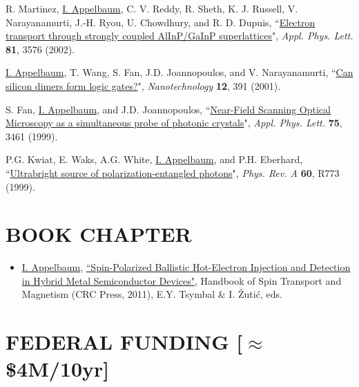 \documentclass[paper=letter,fontsize=11pt]{scrartcl} %
\newcommand{\NewPart}[2]{\section*{\uppercase{#1} #2}}
\newcommand{\PaperEntry}[7]{
		\noindent #1, ``\href{#7}{#2}", \textit{#3} \textbf{#4}, #5 (#6).}
\newcommand{\ArxivEntry}[3]{
		\noindent #1, ``\href{http://arxiv.org/abs/#3}{#2}", \textit{{cond-mat/}#3}.}
\begin{document}
\begin{etaremune}
\item\PaperEntry{R. Martinez, \underline{I. Appelbaum}, C. V. Reddy, R. Sheth, K. J. Russell, V. Narayanamurti, J.-H. Ryou, U. Chowdhury, and R. D. Dupuis}{Electron transport through strongly coupled AlInP/GaInP superlattices}{Appl. Phys. Lett.}{81}{3576}{2002}{http://dx.doi.org/10.1063/1.1519350}

\item\PaperEntry{\underline{I. Appelbaum}, T. Wang, S. Fan, J.D. Joannopoulos, and V. Narayanamurti}{Can silicon dimers form logic gates?}{Nanotechnology}{12}{391}{2001}{http://dx.doi.org/10.1088/0957-4484/12/3/330}

\item\PaperEntry{S. Fan, \underline{I. Appelbaum}, and J.D. Joannopoulos}{Near-Field Scanning Optical Microscopy as a simultaneous probe of photonic crystals}%
{Appl. Phys. Lett.}{75}{3461}{1999}{http://dx.doi.org/10.1063/1.125296}

\item\PaperEntry{P.G. Kwiat, E. Waks, A.G. White, \underline{I. Appelbaum}, and P.H. Eberhard}{Ultrabright source of polarization-entangled photons}{Phys. Rev. A}{60}{R773}{1999}{http://dx.doi.org/10.1103/PhysRevA.60.R773}


\end{etaremune}



\NewPart{Book Chapter}{}
\begin{itemize}
\item \underline{I. Appelbaum}, \href{http://www.crcpress.com/product/isbn/9781439803776}{``Spin-Polarized Ballistic Hot-Electron Injection and Detection in Hybrid Metal Semiconductor Devices"}, Handbook of Spin Transport and Magnetism (CRC Press, 2011), E.Y. Tsymbal \& I. \v{Z}uti\'c, eds.
\end{itemize}



\NewPart{Federal Funding}{[$\approx$\$4M/10yr]}
\end{document}
